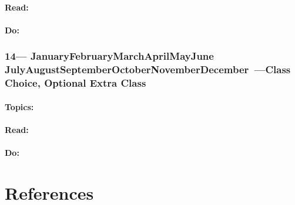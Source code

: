 \documentclass[10pt]{article}
\def\themonth{\ifcase\month\or
	January\or February\or March\or April\or May\or June\or
	July\or August\or September\or October\or November\or December\fi}
\begin{document}
\subsection{Read:}
\subsection{Do:}

\AdvanceDate[7]
\section{14---\themonth~\the\day---Class Choice, Optional Extra Class}
\subsection{Topics:}
\subsection{Read:}
\subsection{Do:}

\part{References}
%

\end{document}
